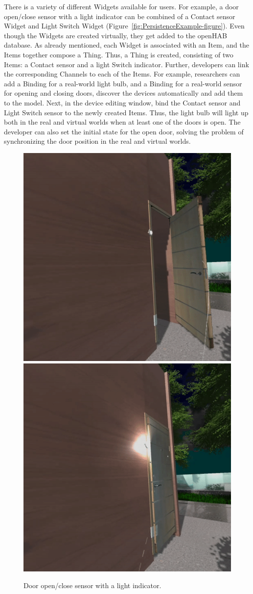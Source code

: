 There is a variety of different Widgets available for users. For example, a door open/close sensor with a light indicator can be combined of a Contact sensor Widget and Light Switch Widget (Figure~\ref{fig:PersistenceExample-figure}). Even though the Widgets are created virtually, they get added to the openHAB database. As already mentioned, each Widget is associated with an Item, and the Items together compose a Thing. Thus, a Thing is created, consisting of two Items: a Contact sensor and a light Switch indicator. Further, developers can link the corresponding Channels to each of the Items. For example, researchers can add a Binding for a real-world light bulb, and a Binding for a real-world sensor for opening and closing doors, discover the devices automatically and add them to the model. Next, in the device editing window, bind the Contact sensor and Light Switch sensor to the newly created Items. Thus, the light bulb will light up both in the real and virtual worlds when at least one of the doors is open. The developer can also set the initial state for the open door, solving the problem of synchronizing the door position in the real and virtual worlds. 

\begin{figure}
  \centering
    {\includegraphics[width=0.45\linewidth]{figures/DoorOpen.png}}
    {\includegraphics[width=0.45\linewidth]{figures/DoorClose.png}}
  \caption{Door open/close sensor with a light indicator.}
  \label{fig:doorsensor}
\end{figure}

